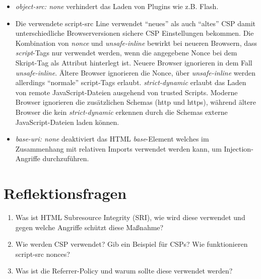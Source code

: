 \begin{itemize}
	\item \textit{object-src: none} verhindert das Laden von Plugins wie z.B. Flash.
	\item Die verwendete script-src Line verwendet ``neues'' als auch ``altes'' CSP damit unterschiedliche Browserversionen sichere CSP Einstellungen bekommen. Die Kombination von \textit{nonce} und \textit{unsafe-inline} bewirkt bei neueren Browsern, dass \textit{script}-Tags nur verwendet werden, wenn die angegebene Nonce bei dem Skript-Tag als Attribut hinterlegt ist. Neuere Browser ignorieren in dem Fall \textit{unsafe-inline}. Ältere Browser ignorieren die Nonce, über \textit{unsafe-inline} werden allerdings ``normale'' script-Tags erlaubt. \textit{strict-dynamic} erlaubt das Laden von remote JavaScript-Dateien ausgehend von trusted Scripts. Moderne Browser ignorieren die zusätzlichen Schemas (http und https), während ältere Browser die kein \textit{strict-dynamic} erkennen durch die Schemas externe JavaScript-Dateien laden können.
	\item \textit{base-uri: none} deaktiviert das HTML \textit{base}-Element welches im Zusammenhang mit relativen Imports verwendet werden kann, um Injection-Angriffe durchzuführen.
\end{itemize}

\section{Reflektionsfragen}

\begin{enumerate}
	\item Was ist HTML Subresource Integrity (SRI), wie wird diese verwendet und gegen welche Angriffe schützt diese Maßnahme?
	\item Wie werden CSP verwendet? Gib ein Beispiel für CSPs? Wie funktionieren script-src nonces?
	\item Was ist die Referrer-Policy und warum sollte diese verwendet werden?
\end{enumerate}
